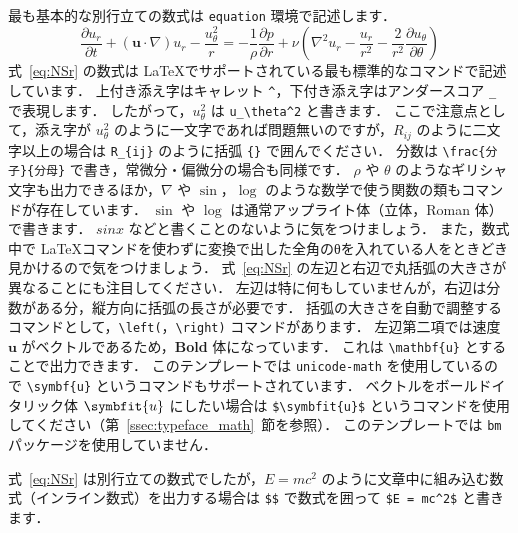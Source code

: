 最も基本的な別行立ての数式は \verb|equation| 環境で記述します．
\begin{equation}
    \frac{\partial u_r}{\partial t} + (\mathbf{u}\cdot\nabla)u_r - \frac{u_\theta^2}{r} = -\frac{1}{\rho}\frac{\partial p}{\partial r} + \nu\left(\nabla^2 u_r - \frac{u_r}{r^2} - \frac{2}{r^2}\frac{\partial u_\theta}{\partial \theta}\right)
    \label{eq:NSr}
\end{equation}
式~\eqref{eq:NSr} の数式は \LaTeX でサポートされている最も標準的なコマンドで記述しています．
上付き添え字はキャレット \verb|^|，下付き添え字はアンダースコア \verb|_| で表現します．
したがって，$u_\theta^2$ は \verb|u_\theta^2| と書きます．
ここで注意点として，添え字が $u_\theta^2$ のように一文字であれば問題無いのですが，$R_{ij}$ のように二文字以上の場合は \verb|R_{ij}| のように括弧 \verb|{}| で囲んでください．
分数は \verb|\frac{分子}{分母}| で書き，常微分・偏微分の場合も同様です．
$\rho$ や $\theta$ のようなギリシャ文字も出力できるほか，$\nabla$ や $\sin$，$\log$ のような数学で使う関数の類もコマンドが存在しています．
$\sin$ や $\log$ は通常アップライト体（立体，Roman 体）で書きます．
$sin x$ などと書くことのないように気をつけましょう．
また，数式中で \LaTeX コマンドを使わずに変換で出した全角のθを入れている人をときどき見かけるので気をつけましょう．
式~\eqref{eq:NSr} の左辺と右辺で丸括弧の大きさが異なることにも注目してください．
左辺は特に何もしていませんが，右辺は分数がある分，縦方向に括弧の長さが必要です．
括弧の大きさを自動で調整するコマンドとして，\verb|\left(|，\verb|\right)| コマンドがあります．
左辺第二項では速度 $\mathbf{u}$ がベクトルであるため，\textbf{Bold} 体になっています．
これは \verb|\mathbf{u}| とすることで出力できます．
このテンプレートでは \verb|unicode-math| を使用しているので \verb|\symbf{u}| というコマンドもサポートされています．
ベクトルをボールドイタリック体 $\symbfit{u}$ にしたい場合は \verb|$\symbfit{u}$| というコマンドを使用してください（第~\ref{ssec:typeface_math}~節を参照）．
このテンプレートでは \verb|bm| パッケージを使用していません．

式~\eqref{eq:NSr} は別行立ての数式でしたが，$E = mc^2$ のように文章中に組み込む数式（インライン数式）を出力する場合は \verb|$$| で数式を囲って \verb|$E = mc^2$| と書きます．

